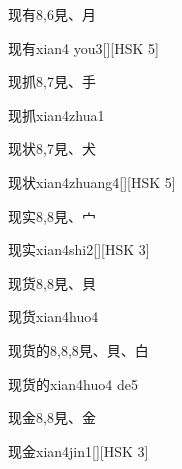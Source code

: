 \begin{entry}{现有}{8,6}{⾒、⽉}
  \begin{phonetics}{现有}{xian4 you3}[][HSK 5]
  \end{phonetics}
\end{entry}

\begin{entry}{现抓}{8,7}{⾒、⼿}
  \begin{phonetics}{现抓}{xian4zhua1}
  \end{phonetics}
\end{entry}

\begin{entry}{现状}{8,7}{⾒、⽝}
  \begin{phonetics}{现状}{xian4zhuang4}[][HSK 5]
  \end{phonetics}
\end{entry}

\begin{entry}{现实}{8,8}{⾒、⼧}
  \begin{phonetics}{现实}{xian4shi2}[][HSK 3]
  \end{phonetics}
\end{entry}

\begin{entry}{现货}{8,8}{⾒、⾙}
  \begin{phonetics}{现货}{xian4huo4}
  \end{phonetics}
\end{entry}

\begin{entry}{现货的}{8,8,8}{⾒、⾙、⽩}
  \begin{phonetics}{现货的}{xian4huo4 de5}
  \end{phonetics}
\end{entry}

\begin{entry}{现金}{8,8}{⾒、⾦}
  \begin{phonetics}{现金}{xian4jin1}[][HSK 3]
  \end{phonetics}
\end{entry}

